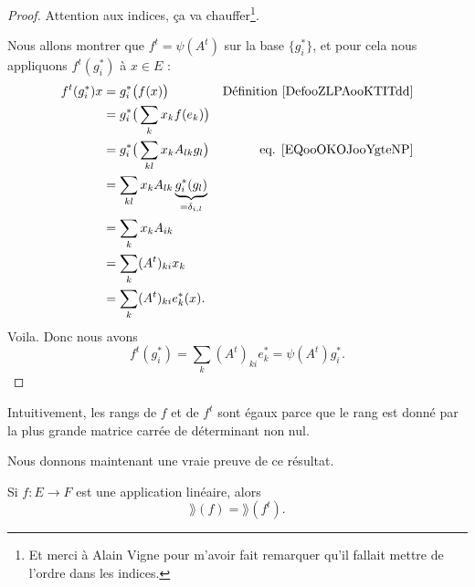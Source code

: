 \begin{proof}
    Attention aux indices, ça va chauffer\footnote{Et merci à Alain Vigne pour m'avoir fait remarquer qu'il fallait mettre de l'ordre dans les indices.}.

    Nous allons montrer que \( f^t=\psi(A^t)\) sur la base \( \{ g_i^* \}\), et pour cela nous appliquons \( f^t(g_i^*)\) à \( x\in E\) :
    \begin{subequations}
        \begin{align}
            f^t(g_i^*)x & =g_i^*\big( f(x) \big)            & \text{Définition  \ref{DefooZLPAooKTITdd}}      \\
                & =g_i^*\big( \sum_kx_kf(e_k) \big)                                                           \\
                & =g_i^*\big( \sum_{kl}x_kA_{lk}g_l \big)   & \text{eq. \eqref{EQooOKOJooYgteNP}}             \\
                & =\sum_{kl}x_kA_{lk}\underbrace{g_i^*(g_l)}_{=\delta_{i,l}}                                  \\
                & =\sum_kx_kA_{ik}                            \\
                & =\sum_k(A^t)_{ki}x_k                        \\
                & =\sum_k(A^t)_{ki}e^*_k(x).
        \end{align}
    \end{subequations}
    Voila. Donc nous avons
    \begin{equation}
        f^t(g_i^*)=\sum_k(A^t)_{ki}e^*_k=\psi(A^t)g_i^*.
    \end{equation}
\end{proof}

\begin{normaltext}
Intuitivement,  les rangs de \( f\) et de \( f^t\) sont égaux parce que le rang est donné par la plus grande matrice carrée de déterminant non nul.

Nous donnons maintenant une vraie preuve de ce résultat.
\end{normaltext}

\begin{lemma}   \label{LemSEpTcW}
    Si \( f\colon E\to F\) est une application linéaire, alors
    \begin{equation}
        \rang(f)=\rang(f^t).
    \end{equation}
\end{lemma}

